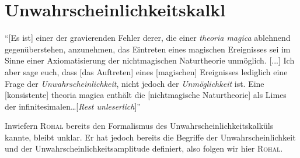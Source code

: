 \chapter[tocentry=Unwahrscheinlichkeitskalkül, head=Unwahrscheinlichkeitskalkül]{Unwahrscheinlichkeitskalk\uech l}
"`[Es ist] einer der gravierenden Fehler derer, die einer \emph{theoria magica} ablehnend gegenüberstehen, anzunehmen, das Eintreten eines magischen Ereignisses sei im Sinne einer Axiomatisierung der nichtmagischen Naturtheorie unmöglich. [...] Ich aber sage euch, dass [das Auftreten] eines [magischen] Ereignisses lediglich eine Frage der \emph{Unwahrscheinlichkeit}, nicht jedoch der \emph{Unmöglichkeit} ist. Eine [konsistente] theoria magica enthält die [nichtmagische Naturtheorie] als Limes der infinitesimalen\ldots [\textit{Rest unleserlich}]"' \cite{apokryphen}

Inwiefern \textsc{Rohal} bereits den Formalismus des Unwahrscheinlichkeitskalküls kannte, bleibt unklar. Er hat jedoch bereits die Begriffe der Unwahrscheinlichkeit und der Unwahrscheinlichkeitsamplitude definiert, also folgen wir hier \textsc{Rohal}.

